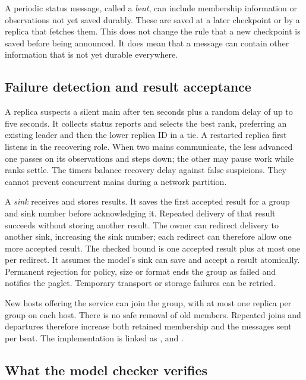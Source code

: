 A periodic status message, called a \emph{beat}, can include membership
information or observations not yet saved durably. These are saved at a
later checkpoint or by a replica that fetches them. This does not change
the rule that a new checkpoint is saved before being announced. It does
mean that a message can contain other information that is not yet durable
everywhere.

\subsection{Failure detection and result acceptance}\label{sec:zombies-recovery}

A replica suspects a silent main after ten seconds plus a random delay
of up to five seconds. It collects status reports and selects the best
rank, preferring an existing leader and then the lower replica ID in a
tie. A restarted replica first listens in the recovering role. When two
mains communicate, the less advanced one passes on its observations
and steps down; the other may pause work while ranks settle. The timers
balance recovery delay against false suspicions. They cannot prevent
concurrent mains during a network partition.

A \emph{sink} receives and stores results. It saves the first accepted
result for a group and sink number before acknowledging it. Repeated
delivery of that result succeeds without storing another result.
The owner can redirect delivery to another sink, increasing the sink
number; each redirect can therefore allow one more accepted result.
The checked bound is one accepted result plus at most one per redirect.
It assumes the model's sink can save and accept a result atomically.
Permanent rejection for policy, size or format ends the group as failed
and notifies the paglet. Temporary transport or storage failures can
be retried.

New hosts offering the service can join the group, with at most one
replica per group on each host. There is no safe removal of old members.
Repeated joins and departures therefore increase both retained membership
and the messages sent per beat. The implementation is linked as
,
and .

\subsection{What the model checker verifies}\label{sec:zombies-check}

